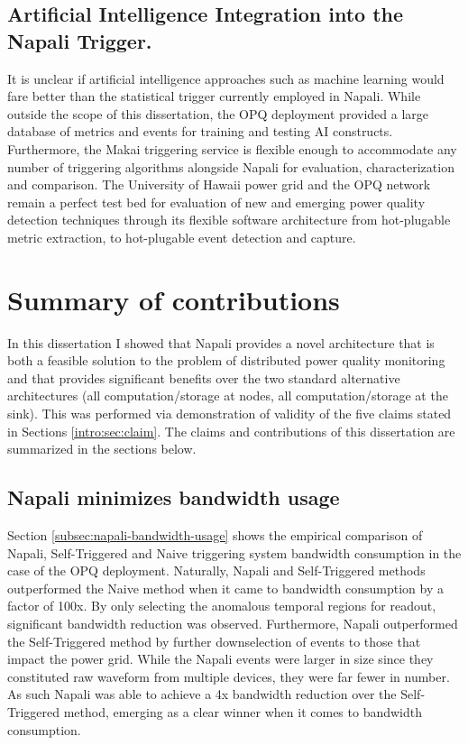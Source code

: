 \subsection{Artificial Intelligence Integration into the Napali Trigger.}\label{subsec:artafitial-inteligence-integration-into-the-napali-trigger.}
It is unclear if artificial intelligence approaches such as machine learning would fare better than the statistical trigger currently employed in Napali.
While outside the scope of this dissertation, the OPQ deployment provided a large database of metrics and events for training and testing AI constructs.
Furthermore, the Makai triggering service is flexible enough to accommodate any number of triggering algorithms alongside Napali for evaluation, characterization and comparison.
The University of Hawaii power grid and the OPQ network remain a perfect test bed for evaluation of new and emerging power quality detection
techniques through its flexible software architecture from hot-plugable metric extraction, to hot-plugable event detection and capture.

\section{Summary of contributions}\label{sec:conclusions}

In this dissertation I showed that Napali provides a novel architecture that is both a feasible solution to the problem of distributed power quality monitoring and that provides significant benefits over the two standard alternative architectures (all computation/storage at nodes, all computation/storage at the sink).
This was performed via demonstration of validity of the five claims stated in Sections \ref{intro:sec:claim}.
The claims and contributions of this dissertation are summarized in the sections below.

\subsection{Napali minimizes bandwidth usage}\label{subsec:conc:napali-minimizes-bandwidth-usage}
Section \ref{subsec:napali-bandwidth-usage} shows the empirical comparison of Napali, Self-Triggered and Naive triggering system bandwidth consumption in the case of the OPQ deployment.
Naturally, Napali and Self-Triggered methods outperformed the Naive method when it came to bandwidth consumption by a factor of 100x.
By only selecting the anomalous temporal regions for readout, significant bandwidth reduction was observed.
Furthermore, Napali outperformed the Self-Triggered method by further downselection of events to those that impact the power grid.
While the Napali events were larger in size since they constituted raw waveform from multiple devices, they were far fewer in number.
As such Napali was able to achieve a 4x bandwidth reduction over the Self-Triggered method, emerging as a clear winner when it comes to bandwidth consumption.

